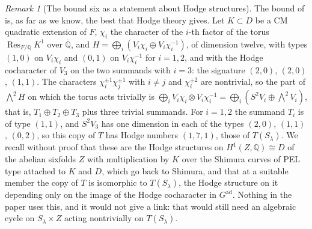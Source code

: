 \documentclass[11pt,reqno]{amsart}
\theoremstyle{plain}
\theoremstyle{definition}
\theoremstyle{remark}
\newtheorem{remark}[theorem]{Remark}
\newcommand{\QQ}{\mathbb{Q}}
\DeclareMathOperator{\Res}{Res}
\begin{document}
\begin{remark}[The bound six as a statement about Hodge structures]
\label{rem:mumfordunitary}
The bound of  is, as far as we know, the best that
Hodge theory gives. Let $K\subset D$ be a CM quadratic extension of $F$,
$\chi_{i}$ the character of the $i$-th factor of the torus
$\Res_{F/\QQ}K^{1}$ over $\bar{\QQ}$, and
$H=\bigoplus_{i}(V_{i}\chi_{i}\oplus V_{i}\chi_{i}^{-1})$, of dimension twelve,
with types $(1,0)$ on $V_{i}\chi_{i}$ and $(0,1)$ on $V_{i}\chi_{i}^{-1}$ for
$i=1,2$, and with the Hodge cocharacter of $V_{3}$ on the two summands with
$i=3$: the signature $(2,0)$, $(2,0)$, $(1,1)$. The characters
$\chi_{i}^{\pm1}\chi_{j}^{\pm1}$ with $i\ne j$ and $\chi_{i}^{\pm2}$ are
nontrivial, so the part of $\bigwedge^{2}H$ on which the torus acts trivially
is $\bigoplus_{i}V_{i}\chi_{i}\otimes V_{i}\chi_{i}^{-1}=\bigoplus_{i}
(S^{2}V_{i}\oplus\bigwedge^{2}V_{i})$, that is, $T_{1}\oplus T_{2}\oplus T_{3}$
plus three trivial summands. For $i=1,2$ the summand $T_{i}$ is of type
$(1,1)$, and $S^{2}V_{3}$ has one dimension in each of the types $(2,0)$,
$(1,1)$, $(0,2)$, so this copy of $T$ has Hodge numbers $(1,7,1)$, those of
$T(S_{\lambda})$. We recall
without proof that these are the Hodge structures on $H^{1}(Z,\QQ)\cong D$ of
the abelian sixfolds $Z$ with multiplication by $K$ over the Shimura curves of
PEL type attached to $K$ and $D$, which go back to Shimura, and that at a
suitable member the copy of $T$ is isomorphic to $T(S_{\lambda})$, the Hodge
structure on it depending only on the image of the Hodge cocharacter in
$G^{\mathrm{ad}}$. Nothing in the paper uses this, and it would not give a
link: that would still need an algebraic cycle on $S_{\lambda}\times Z$ acting
nontrivially on $T(S_{\lambda})$.
\end{remark}
\end{document}
